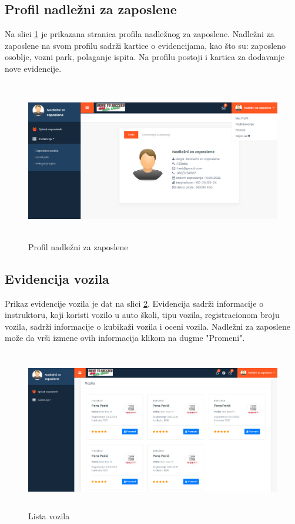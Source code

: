 \subsection{Profil nadležni za zaposlene}

Na slici  \ref{fig:ui_nadlezni} je prikazana stranica profila nadležnog za zaposlene. Nadležni za zaposlene na svom profilu sadrži kartice o evidencijama, kao što su: zaposleno osoblje, vozni park, polaganje ispita. Na profilu postoji i kartica za dodavanje nove evidencije.

\begin{figure}[H]
  \begin{center}
      \includegraphics[width=140mm, height=70mm]{UI/UI_nadlezni_za_zaposlene.png}
  \end{center}
  \caption {Profil nadležni za zaposlene}
  \label{fig:ui_nadlezni}

\end{figure}

\subsection{Evidencija vozila}

Prikaz evidencije vozila je dat na slici \ref{fig:ui_vozila}. Evidencija sadrži informacije o instruktoru, koji koristi vozilo u auto školi, tipu vozila, registracionom broju vozila, sadrži informacije o kubikaži vozila i oceni vozila. Nadležni za zaposlene može da vrši izmene ovih informacija klikom na dugme "Promeni".



\begin{figure}[H]
  \begin{center}
      \includegraphics[width=140mm, height=70mm]{UI/UI_Nadlezni_za_zaposlene_vozila.png}
  \end{center}
  \caption {Lista vozila}
  \label{fig:ui_vozila}

\end{figure}

